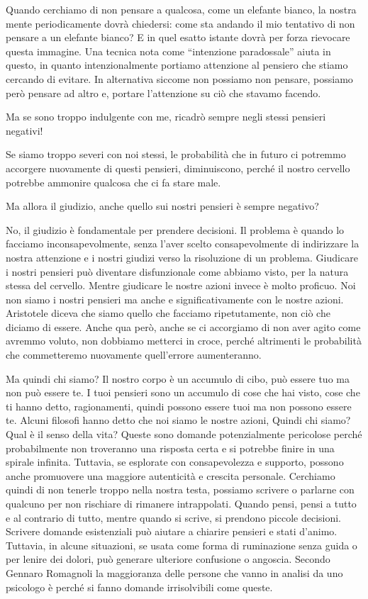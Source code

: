 \documentclass[12pt]{book} %
\begin{document}
Quando cerchiamo di non pensare a qualcosa, come un elefante bianco, la nostra mente periodicamente dovrà chiedersi:
come sta andando il mio tentativo di non pensare a un elefante bianco? E in quel esatto istante dovrà per forza
rievocare questa immagine. Una tecnica nota come “intenzione paradossale” aiuta in questo, in quanto intenzionalmente
portiamo attenzione al pensiero che stiamo cercando di evitare. In alternativa siccome non possiamo non pensare,
possiamo però pensare ad altro e, portare l'attenzione su ciò che stavamo facendo. 

Ma se sono troppo indulgente con me, ricadrò sempre negli stessi pensieri negativi! 

Se siamo troppo severi con noi stessi, le probabilità che in futuro ci potremmo accorgere nuovamente di
questi pensieri, diminuiscono, perché il nostro cervello potrebbe ammonire qualcosa che ci fa stare male. 

Ma allora il giudizio, anche quello sui nostri pensieri è sempre negativo?

No, il giudizio è fondamentale per prendere decisioni. Il problema è quando lo facciamo inconsapevolmente, senza
l'aver scelto consapevolmente di indirizzare la nostra attenzione e i nostri giudizi verso la
risoluzione di un problema. Giudicare i nostri pensieri può diventare disfunzionale come abbiamo visto, per la natura stessa del
cervello. Mentre giudicare le nostre azioni invece è molto proficuo. Noi non siamo i nostri pensieri ma anche e significativamente con le nostre azioni. Aristotele diceva che siamo quello che facciamo ripetutamente, non ciò che diciamo di essere. Anche qua però, anche se ci accorgiamo di non aver agito come avremmo voluto, non dobbiamo metterci in croce, perché altrimenti le probabilità che commetteremo nuovamente quell'errore aumenteranno. 

Ma quindi chi siamo? Il nostro corpo è un accumulo di cibo, può essere tuo ma non può essere te. I tuoi pensieri sono un
accumulo di cose che hai visto, cose che ti hanno detto, ragionamenti, quindi possono essere tuoi ma non possono essere
te. Alcuni filosofi hanno detto che noi siamo le nostre azioni, Quindi chi siamo? Qual è il senso della vita? Queste sono domande
potenzialmente pericolose perché probabilmente non troveranno una risposta certa e si potrebbe finire in una spirale infinita. Tuttavia, se esplorate con consapevolezza e supporto, possono anche promuovere una maggiore autenticità e crescita personale. Cerchiamo quindi di non tenerle troppo nella nostra testa, possiamo scrivere o parlarne con qualcuno per non rischiare di rimanere intrappolati. Quando pensi, pensi a tutto e al contrario di tutto, mentre quando si scrive, si prendono piccole decisioni. Scrivere domande esistenziali può aiutare a chiarire pensieri e stati d’animo. Tuttavia, in alcune situazioni, se usata come forma di ruminazione senza guida o per lenire dei dolori, può generare ulteriore confusione o angoscia. 
Secondo Gennaro Romagnoli la maggioranza delle persone che vanno in analisi da uno psicologo è perché si fanno domande irrisolvibili come queste.
\end{document}
